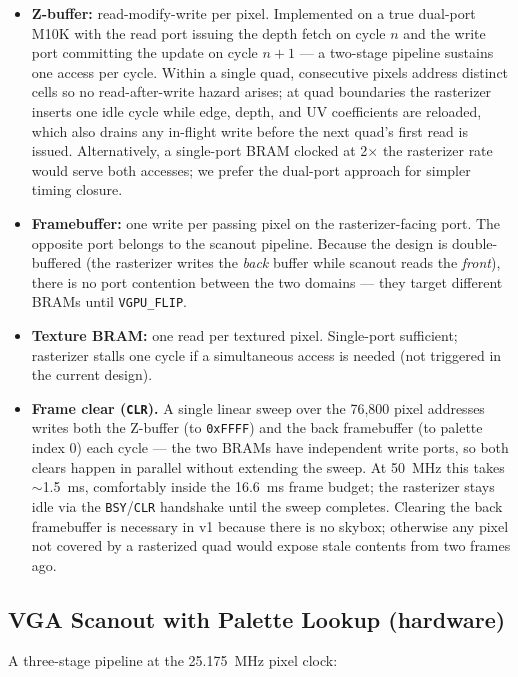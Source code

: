 \documentclass[11pt]{article}
\begin{document}
\begin{itemize}
\item \textbf{Z-buffer:} read-modify-write per pixel. Implemented on a true dual-port M10K with the read port issuing the depth fetch on cycle $n$ and the write port committing the update on cycle $n+1$ --- a two-stage pipeline sustains one access per cycle. Within a single quad, consecutive pixels address distinct cells so no read-after-write hazard arises; at quad boundaries the rasterizer inserts one idle cycle while edge, depth, and UV coefficients are reloaded, which also drains any in-flight write before the next quad's first read is issued. Alternatively, a single-port BRAM clocked at 2$\times$ the rasterizer rate would serve both accesses; we prefer the dual-port approach for simpler timing closure.
\item \textbf{Framebuffer:} one write per passing pixel on the rasterizer-facing port. The opposite port belongs to the scanout pipeline. Because the design is double-buffered (the rasterizer writes the \emph{back} buffer while scanout reads the \emph{front}), there is no port contention between the two domains --- they target different BRAMs until \texttt{VGPU\_FLIP}.
\item \textbf{Texture BRAM:} one read per textured pixel. Single-port sufficient; rasterizer stalls one cycle if a simultaneous access is needed (not triggered in the current design).
\item \textbf{Frame clear (\texttt{CLR}).} A single linear sweep over the 76{,}800 pixel addresses writes both the Z-buffer (to \texttt{0xFFFF}) and the back framebuffer (to palette index 0) each cycle --- the two BRAMs have independent write ports, so both clears happen in parallel without extending the sweep. At 50~MHz this takes $\sim$1.5~ms, comfortably inside the 16.6~ms frame budget; the rasterizer stays idle via the \texttt{BSY}/\texttt{CLR} handshake until the sweep completes. Clearing the back framebuffer is necessary in v1 because there is no skybox; otherwise any pixel not covered by a rasterized quad would expose stale contents from two frames ago.
\end{itemize}

\subsection{VGA Scanout with Palette Lookup (hardware)}

A three-stage pipeline at the 25.175~MHz pixel clock:
\end{document}
